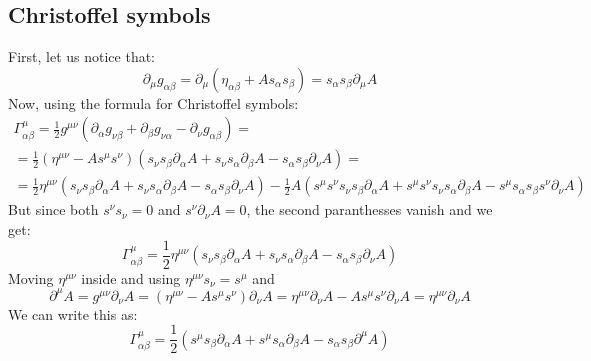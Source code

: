 \documentclass{article}
\begin{document}
\subsection{Christoffel symbols}
First, let us notice that:
\begin{equation}
    \partial_\mu g_{\alpha\beta} = \partial_\mu \left(\eta_{\alpha\beta} + A s_{\alpha} s_{\beta}\right) = s_\alpha s_\beta \partial_\mu A 
\end{equation}
Now, using the formula for Christoffel symbols:
\begin{equation}
\begin{gathered}
    \Gamma^\mu_{\alpha\beta} = \frac{1}{2}g^{\mu\nu}\left(\partial_{\alpha}g_{\nu\beta} + \partial_{\beta}g_{\nu\alpha} - \partial_{\nu}g_{\alpha\beta}\right) = \\ = \frac{1}{2}\left(\eta^{\mu\nu} - A s^\mu s^\nu\right)
    \left(
        s_\nu s_\beta \partial_\alpha A 
        + s_\nu s_\alpha \partial_\beta A 
        - s_\alpha s_\beta \partial_\nu A 
    \right) = \\ = \frac{1}{2}\eta^{\mu\nu}
    \left(
        s_\nu s_\beta \partial_\alpha A 
        + s_\nu s_\alpha \partial_\beta A 
        - s_\alpha s_\beta \partial_\nu A 
    \right) - \frac{1}{2}A\left(
        s^\mu s^\nu s_\nu s_\beta \partial_\alpha A 
        + s^\mu s^\nu s_\nu s_\alpha \partial_\beta A 
        -s^\mu s_\alpha s_\beta s^\nu \partial_\nu A 
    \right)
\end{gathered}
\end{equation}
But since both $s^\nu s_\nu = 0$ and $s^\nu \partial_\nu A = 0$, the second paranthesses vanish and we get:
\begin{equation}
    \Gamma^\mu_{\alpha\beta} = \frac{1}{2}\eta^{\mu\nu}
    \left(
        s_\nu s_\beta \partial_\alpha A 
        + s_\nu s_\alpha \partial_\beta A 
        - s_\alpha s_\beta \partial_\nu A 
    \right)
\end{equation}
Moving $\eta^{\mu\nu}$ inside and using $\eta^{\mu\nu}s_\nu = s^\mu$ and
\begin{equation}
    \partial^\mu A = g^{\mu\nu}\partial_\nu A = (\eta^{\mu\nu} - A s^\mu s^\nu)\partial_\nu A = \eta^{\mu\nu} \partial_\nu A - A s^\mu s^\nu \partial_\nu A = \eta^{\mu\nu} \partial_\nu A
\end{equation}
We can write this as:
\begin{equation}
\label{eq:christoffel-final}
    \Gamma^\mu_{\alpha\beta} = \frac{1}{2}
    \left(
        s^\mu s_\beta \partial_\alpha A 
        + s^\mu s_\alpha \partial_\beta A 
        - s_\alpha s_\beta \partial^\mu A 
    \right)
\end{equation}
\end{document}
